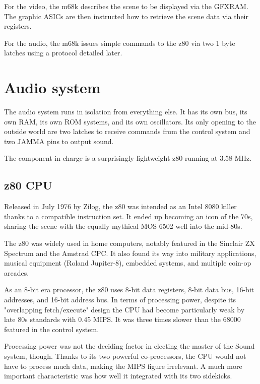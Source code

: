 For the video, the m68k describes the scene to be displayed via the GFXRAM. The graphic ASICs are then instructed how to retrieve the scene data via their registers. 

For the audio, the m68k issues simple commands to the z80 via two 1 byte latches using a protocol detailed later.
  











\pagebreak
\section{Audio system}
The audio system runs in isolation from everything else. It has its own bus, its own RAM, its own ROM systems, and its own oscillators. Its only opening to the outside world are two latches to receive commands from the control system and two JAMMA pins to output sound.

The component in charge is a surprisingly lightweight z80 running at 3.58 MHz.

\subsection{z80 CPU}
Released in July 1976 by Zilog, the z80 was intended as an Intel 8080 killer thanks to a compatible instruction set. It ended up becoming an icon of the 70s, sharing the scene with the equally mythical MOS 6502 well into the mid-80s. 

The z80 was widely used in home computers, notably featured in the Sinclair ZX Spectrum and the Amstrad CPC. It also found its way into military applications, musical equipment (Roland Jupiter-8), embedded systems, and multiple coin-op arcades. 

As an 8-bit era processor, the z80 uses 8-bit data registers, 8-bit data bus, 16-bit addresses, and 16-bit address bus. In terms of processing power, despite its "overlapping fetch/execute" design the CPU had become particularly weak by late 80s standards with 0.45 MIPS. It was three times slower than the 68000 featured in the control system\cite{mips}. 


Processing power was not the deciding factor in electing the master of the Sound system, though. Thanks to its two powerful co-processors, the CPU would not have to process much data, making the MIPS figure irrelevant. A much more important characteristic was how well it integrated with its two sidekicks.

